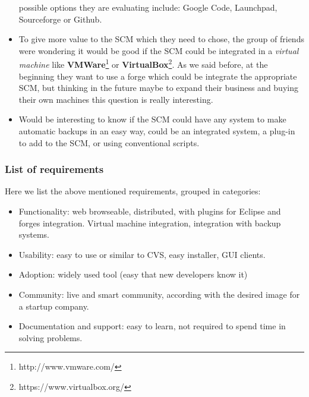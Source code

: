 \documentclass[a4paper,10pt]{article}
\begin{document}
\begin{itemize}
possible options they are evaluating include: Google Code\cite{GoogleCode},
Launchpad\cite{Launchpad}, Sourceforge\cite{Sourceforge} or Github\cite{Github}.
\item To give more value to the SCM which they need to chose, the group
of friends were wondering it would be good if the SCM could be integrated in a
\textit{virtual machine} like \textbf{VMWare}\footnote{http://www.vmware.com/}
or \textbf{VirtualBox}\footnote{https://www.virtualbox.org/}.
As we said before, at the beginning they want to use a forge which could be
integrate the appropriate SCM, but thinking in the future maybe to expand their
business and buying their own machines this question is really interesting.
\item Would be interesting to know if the SCM could have any system to make
automatic backups in an easy way, could be an integrated system, a plug-in to add to the SCM, or using conventional scripts.
\end{itemize}
\subsubsection{List of requirements}
Here we list the above mentioned requirements, grouped in categories:
\begin{itemize}
 \item Functionality: web browseable, distributed, with plugins for Eclipse and
forges integration. Virtual machine integration, integration with backup
systems.
 \item Usability: easy to use or similar to CVS, easy installer, GUI
clients.
 \item Adoption: widely used tool (easy that new developers know it)
 \item Community: live and smart community, according with the desired image
for a startup company.
 \item Documentation and support: easy to learn, not required to spend time in
solving problems.
\end{itemize}
\end{document}
